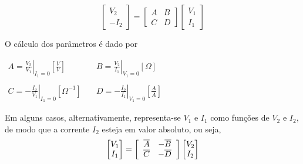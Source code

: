 \documentclass{article}
\numberwithin{equation}{section}
\begin{document}
\begin{equation}
    \begin{bmatrix}
        V_{2} \\
        -I_{2}
    \end{bmatrix}
    = %
    \begin{bmatrix}
        A & B \\
        C & D
    \end{bmatrix}
    \begin{bmatrix}
        V_{1} \\
        I_{1}
    \end{bmatrix}
\end{equation}

\noindent O cálculo dos parâmetros é dado por
\begin{center}
    $\begin{matrix} %
            A=\displaystyle\left.\frac{V_{2}}{V_{1}}\right|_{I_{1}=0} \left[\frac{V}{V}\right] &\quad B=\displaystyle\left.\frac{V_{2}}{I_{1}}\right|_{V_{1}=0}[\Omega]\\\\
            C=\displaystyle\left.-\frac{I_{2}}{V_{1}}\right|_{I_{1}=0}[\Omega^{-1}]&\quad
            D=\displaystyle\left.-\frac{I_{2}}{I_{1}}\right|_{V_{1}=0}\left[\frac{A}{A}\right]
    \end{matrix}$
\end{center}

Em alguns casos, alternativamente, representa-se $V_{1}$ e $I_{1}$ como funções de $V_{2}$ e $I_{2}$, de modo que a corrente $I_{2}$ esteja em valor absoluto, ou seja,
\begin{equation*}
    \begin{bmatrix}
        V_{1} \\
        I_{1}
    \end{bmatrix}
    = %
    \begin{bmatrix}
        \hspace{0.2cm} \overline{A} & -\overline{B} \hspace{0.2cm} \\
        \hspace{0.2cm} \overline{C} & -\overline{D} \hspace{0.2cm}
    \end{bmatrix}
    \begin{bmatrix}
        V_{2} \\
        I_{2}
    \end{bmatrix}
\end{equation*}
\end{document}
